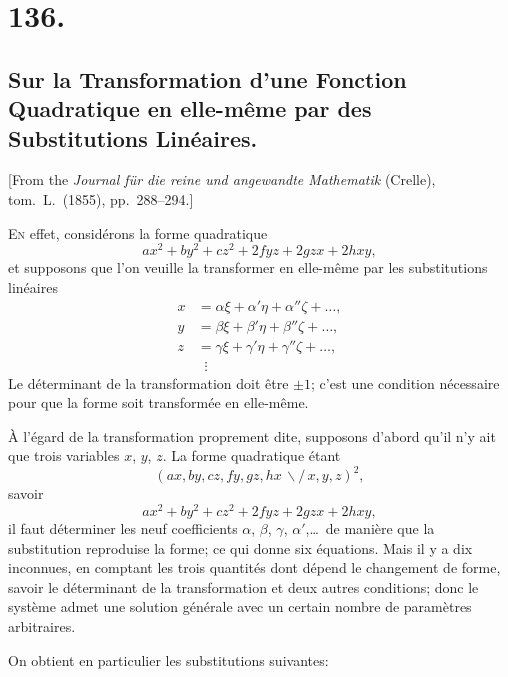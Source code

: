 \documentclass[11pt,a4paper]{book}
\begin{document}
\newpage
\section*{136.}
\subsection*{Sur la Transformation d'une Fonction Quadratique en elle-m\^eme par des Substitutions Lin\'eaires.}

[From the \textit{Journal f\"ur die reine und angewandte Mathematik} (Crelle),
tom.\ L.\ (1855), pp.\ 288--294.]

\medskip

\textsc{En} effet, consid\'erons la forme quadratique
\[
ax^2 + by^2 + cz^2 + 2fyz + 2gzx + 2hxy,
\]
et supposons que l'on veuille la transformer en elle-m\^eme par les
substitutions lin\'eaires
\begin{align*}
x &= \alpha\xi + \alpha'\eta + \alpha''\zeta + \ldots, \\
y &= \beta\xi + \beta'\eta + \beta''\zeta + \ldots, \\
z &= \gamma\xi + \gamma'\eta + \gamma''\zeta + \ldots, \\
& \;\;\vdots
\end{align*}
Le d\'eterminant de la transformation doit \^etre $\pm 1$; c'est une
condition n\'ecessaire pour que la forme soit transform\'ee en elle-m\^eme.

\medskip

\`A l'\'egard de la transformation proprement dite, supposons d'abord
qu'il n'y ait que trois variables $x$, $y$, $z$. La forme quadratique
\'etant
\[
(ax, by, cz, fy, gz, hx \,\backslash\!\!\!/\, x, y, z)^2,
\]
savoir
\[
ax^2 + by^2 + cz^2 + 2fyz + 2gzx + 2hxy,
\]
il faut d\'eterminer les neuf coefficients $\alpha$, $\beta$, $\gamma$,
$\alpha'$,\ldots\ de mani\`ere que la substitution reproduise la forme;
ce qui donne six \'equations. Mais il y a dix inconnues, en comptant les
trois quantit\'es dont d\'epend le changement de forme, savoir le
d\'eterminant de la transformation et deux autres conditions; donc le
syst\`eme admet une solution g\'en\'erale avec un certain nombre de
param\`etres arbitraires.

\medskip

On obtient en particulier les substitutions suivantes:
\end{document}
